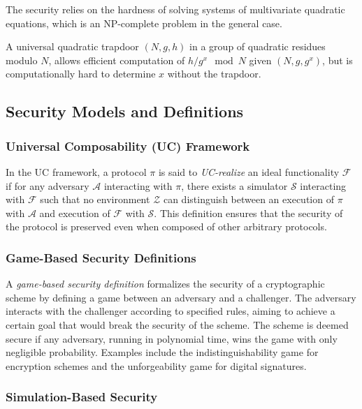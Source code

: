 \documentclass{iacrtrans}
\begin{document}
The security relies on the hardness of solving systems of multivariate quadratic equations, which is an NP-complete problem in the general case.

\begin{definition}
	A universal quadratic trapdoor $(N, g, h)$ in a group of quadratic residues modulo $N$, allows efficient computation of $h/g^x \mod N$ given $(N, g, g^x)$, but is computationally hard to determine $x$ without the trapdoor.
\end{definition}

\subsection{Security Models and Definitions}

\subsubsection{Universal Composability (UC) Framework}
\begin{definition}
	In the UC framework, a protocol $\pi$ is said to \textit{UC-realize} an ideal functionality $\mathcal{F}$ if for any adversary $\mathcal{A}$ interacting with $\pi$, there exists a simulator $\mathcal{S}$ interacting with $\mathcal{F}$ such that no environment $\mathcal{Z}$ can distinguish between an execution of $\pi$ with $\mathcal{A}$ and execution of $\mathcal{F}$ with $\mathcal{S}$. This definition ensures that the security of the protocol is preserved even when composed of other arbitrary protocols.
\end{definition}

\subsubsection{Game-Based Security Definitions}

A \textit{game-based security definition} formalizes the security of a cryptographic scheme by defining a game between an adversary and a challenger. The adversary interacts with the challenger according to specified rules, aiming to achieve a certain goal that would break the security of the scheme. The scheme is deemed secure if any adversary, running in polynomial time, wins the game with only negligible probability. Examples include the indistinguishability game for encryption schemes and the unforgeability game for digital signatures.

\subsubsection{Simulation-Based Security}
\end{document}
